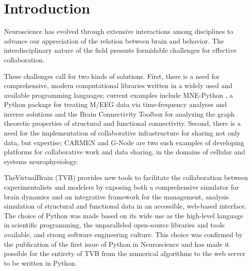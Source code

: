 \documentclass{bioinfo}
\begin{document}
\section{Introduction}

%
Neuroscience has evolved through extensive interactions among disciplines
to advance our appreciation of the relation between brain and behavior.
The interdisciplinary nature of the field presents formidable challenges
for effective collaboration.

These challenges call for two kinds of solutions. First, there is a need
for comprehensive, modern computational libraries written in a widely
used and available programming languages; current examples include MNE-Python \citep{mnepython},
a Python package for treating M/EEG data via time-frequency analyses and inverse
solutions and the Brain Connectivity
Toolbox \citep{rubinov2010complex} for analyzing the graph theoretic
properties of structural and functional connectivity. Second, there is
a need for the implementation
of collaborative infrastructure for sharing not only data, but expertise; 
CARMEN \citep{austin2011carmen} and G-Node \citep{herz2008g} are two such
examples of developing platforms for collaborative work and data sharing, 
in the domains of cellular and systems neurophysiology.

TheVirtualBrain (TVB) provides new tools to facilitate the collaboration
between experimentalists and modelers by exposing both a comprehensive
simulator for brain dynamics and an integrative framework for the management,
analysis simulation of structural and functional data in an accessible,
web-based interface. The choice of Python was made based on its wide use as the
high-level language in scientific programming, the unparalleled open-source
libraries and tools available, and strong software engineering culture.  This
choice was confirmed by the publication of the first issue of Python in
Neuroscience and has made it possible for the entirety of TVB from the
numerical algorithms to the web server to be written in Python.
\end{document}
